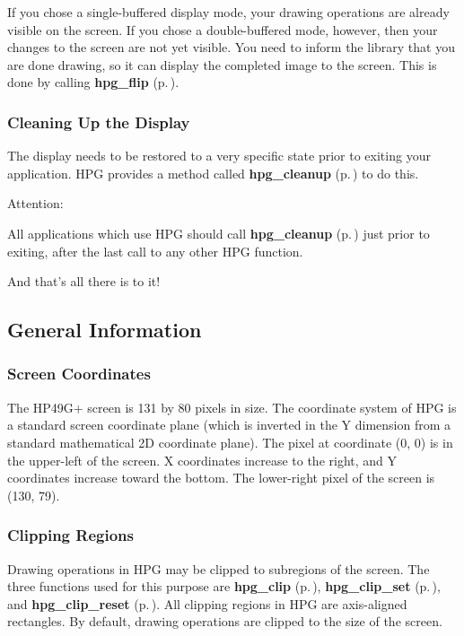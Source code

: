 If you chose a single-buffered display mode, your drawing operations are already visible on the screen. If you chose a double-buffered mode, however, then your changes to the screen are not yet visible. You need to inform the library that you are done drawing, so it can display the completed image to the screen. This is done by calling {\bf hpg\_\-flip} {\rm (p.\,\pageref{hpgraphics_8h_a34})}.

\subsubsection{Cleaning Up the Display}\label{cleaning}


The display needs to be restored to a very specific state prior to exiting your application. HPG provides a method called {\bf hpg\_\-cleanup} {\rm (p.\,\pageref{hpgraphics_8h_a29})} to do this.

\begin{Desc}
\item[Attention: ]\par
All applications which use HPG should call {\bf hpg\_\-cleanup} {\rm (p.\,\pageref{hpgraphics_8h_a29})} just prior to exiting, after the last call to any other HPG function.\end{Desc}
And that's all there is to it!

\subsection{General Information}\label{general}


\subsubsection{Screen Coordinates}\label{coordinates}


The HP49G+ screen is 131 by 80 pixels in size. The coordinate system of HPG is a standard screen coordinate plane (which is inverted in the Y dimension from a standard mathematical 2D coordinate plane). The pixel at coordinate (0, 0) is in the upper-left of the screen. X coordinates increase to the right, and Y coordinates increase toward the bottom. The lower-right pixel of the screen is (130, 79).

\subsubsection{Clipping Regions}\label{clipping}


Drawing operations in HPG may be clipped to subregions of the screen. The three functions used for this purpose are {\bf hpg\_\-clip} {\rm (p.\,\pageref{hpgraphics_8h_a37})}, {\bf hpg\_\-clip\_\-set} {\rm (p.\,\pageref{hpgraphics_8h_a36})}, and {\bf hpg\_\-clip\_\-reset} {\rm (p.\,\pageref{hpgraphics_8h_a35})}. All clipping regions in HPG are axis-aligned rectangles. By default, drawing operations are clipped to the size of the screen.

